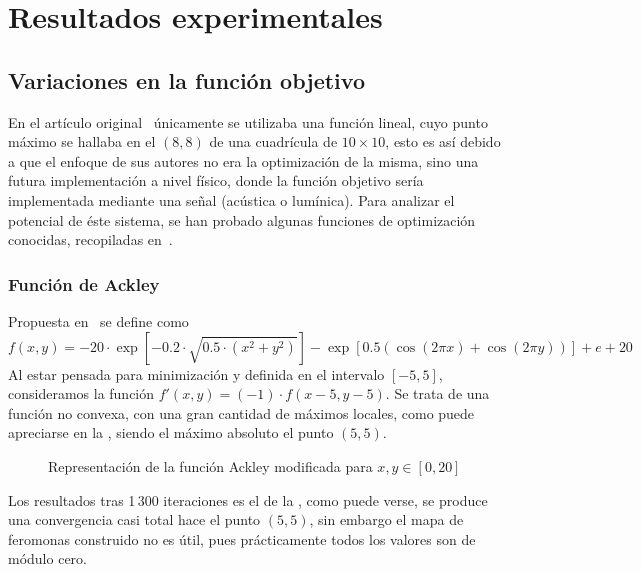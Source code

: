 	\section{Resultados experimentales}
	\label{sec:resultados}

	
	
	\subsection{Variaciones en la función objetivo}
	En el artículo original~\cite{initialPaper} únicamente se utilizaba una función lineal, cuyo punto máximo se hallaba en el $(8,8)$ de una cuadrícula de $10\times10$, esto es así debido a que el enfoque de sus autores no era la optimización de la misma, sino una futura implementación a nivel físico, donde la función objetivo sería implementada mediante una señal (acústica o lumínica). Para analizar el potencial de éste sistema, se han probado algunas funciones de optimización conocidas, recopiladas en~\cite{WebFuncionesOptimizacion}.
	
	\subsubsection{Función de Ackley} Propuesta en~\cite{AckleyFunction} se define como
	\[ f(x,y)=-20 \cdot \exp[-0.2 \cdot \sqrt{0.5 \cdot (x^2 + y^2)}] - \exp[0.5 ( \cos(2 \pi x)
	+ \cos(2 \pi y))] + e + 20\]
	Al estar pensada para minimización y definida en el intervalo $[-5,5]$, consideramos la función $f'(x,y)=(-1)\cdot f(x-5, y-5)$. Se trata de una función no convexa, con una gran cantidad de máximos locales, como puede apreciarse en la , siendo el máximo absoluto el punto $(5,5)$.
	
	\begin{figure}[htbp]
	    \centering
	    \caption{Representación de la función Ackley modificada para $x,y\in[0,20]$}
	    \label{fig:2}
	\end{figure}
	
	Los resultados tras 1\,300 iteraciones es el de la , como puede verse, se produce una convergencia casi total hace el punto $(5,5)$, sin embargo el mapa de feromonas construido no es útil, pues prácticamente todos los valores son de módulo cero.
	
